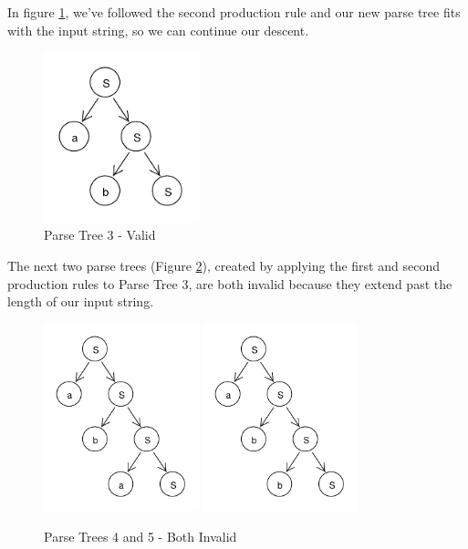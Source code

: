 \documentclass[11pt]{article}
\begin{document}
In figure \ref{fig:rdp_3}, we've followed the second production rule
and our new parse tree fits with the input string, so we can continue our descent.

\begin{figure}[h!]
    \centering
    \includegraphics[width=0.4\textwidth,natwidth=30,natheight=30]{rdp_3.pdf}
    \caption{Parse Tree 3 - Valid}
    \label{fig:rdp_3}
\end{figure}

The next two parse trees (Figure \ref{fig:rdp_4_5}), created by applying the first and second production rules to
Parse Tree 3, are both invalid because they extend past the length of our input string.

\begin{figure}[h!]
    \centering
    \includegraphics[width=0.4\textwidth,natwidth=30,natheight=30]{rdp_4.pdf}
    \includegraphics[width=0.4\textwidth,natwidth=30,natheight=30]{rdp_5.pdf}
    \caption{Parse Trees 4 and 5 - Both Invalid}
    \label{fig:rdp_4_5}
\end{figure}
\end{document}
